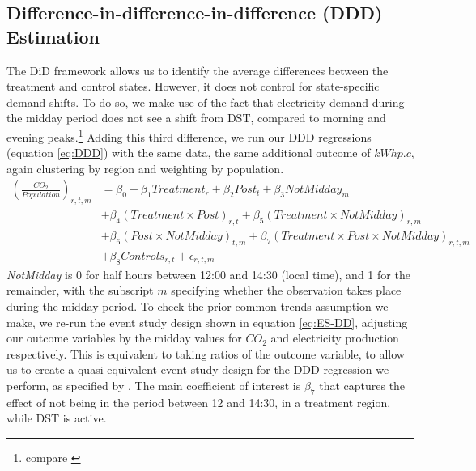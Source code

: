 \subsection{Difference-in-difference-in-difference (DDD) Estimation}
The \ac{DiD} framework allows us to identify the average differences between the treatment and control states. However, it does not control for state-specific demand shifts. To do so, we make use of the fact that electricity demand during the midday period does not see a shift from DST, compared to morning and evening peaks.\footnote{compare \textcite{kellogg_daylight_2008}} 
Adding this third difference, we run our DDD regressions (equation \ref{eq:DDD}) with the same data, the same additional outcome of $kWh p.c$, again clustering by region and weighting by population.
\begin{align}
    \label{eq:DDD}
    \left(\frac{CO_2}{Population}\right)_{r,t,m} &= \beta_0 + \beta_1Treatment_{r} + \beta_2Post_{t} + \beta_3NotMidday_{m}   \\
    & +\beta_4(Treatment \times Post)_{r,t} + 
    \beta_5(Treatment \times NotMidday)_{r,m} \nonumber \\ 
    & +\beta_6(Post \times NotMidday)_{t,m} + \beta_7 (Treatment \times Post \times NotMidday)_{r,t,m} \nonumber \\ 
    &+ \beta_8 Controls_{r,t}  + \epsilon_{r,t,m}
    \nonumber 
\end{align}
\textit{NotMidday} is 0 for half hours between 12:00 and 14:30 (local time), and 1 for the remainder, with the subscript $m$ specifying whether the observation takes place during the midday period.
To check the prior common trends assumption we make, we re-run the event study design shown in equation \ref{eq:ES-DD}, adjusting our outcome variables by the midday values for $CO_2$ and electricity production respectively. This is equivalent to taking ratios of the outcome variable, to allow us to create a quasi-equivalent event study design for the \ac{DDD} regression we perform, as specified by \textcite{olden_triple_2022}. The main coefficient of interest is $\beta_7$ that captures the effect of not being in the period between 12 and 14:30, in a treatment region, while \ac{DST} is active.
